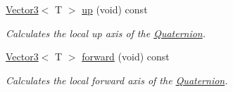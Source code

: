 \begin{DoxyCompactItemize}
\hyperlink{classsparky_1_1_vector3}{Vector3}$<$ T $>$ \hyperlink{classsparky_1_1_quaternion_a9fc8bf81b7411ee1a3c3a644296c5a6a}{up} (void) const 
\begin{DoxyCompactList}\small\item\em Calculates the local up axis of the \hyperlink{classsparky_1_1_quaternion}{Quaternion}. \end{DoxyCompactList}\item 
\hyperlink{classsparky_1_1_vector3}{Vector3}$<$ T $>$ \hyperlink{classsparky_1_1_quaternion_acb9c7a45346fb1c8055ae0b053afbaef}{forward} (void) const 
\begin{DoxyCompactList}\small\item\em Calculates the local forward axis of the \hyperlink{classsparky_1_1_quaternion}{Quaternion}. \end{DoxyCompactList}\end{DoxyCompactItemize}
